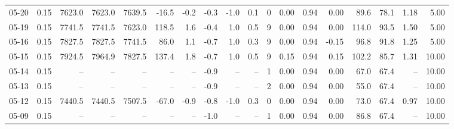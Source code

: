 \begin{threeparttable}
{\begin{tabular}{lrrrrrrrrrrrrrrrrr}
  05-20 &     0.15 & 7623.0 & 7623.0 & 7639.5 &      -16.5 &           -0.2 &                      -0.3 &                     -1.0 &                 0.1 &              0 &       0.00 &      0.94 &           0.00 &             89.6 &                78.1 &            1.18 &                   5.00 \\
  05-19 &     0.15 & 7741.5 & 7741.5 & 7623.0 &      118.5 &            1.6 &                      -0.4 &                      1.0 &                 0.5 &              9 &       0.00 &      0.94 &           0.00 &            114.0 &                93.5 &            1.50 &                   5.00 \\
  05-16 &     0.15 & 7827.5 & 7827.5 & 7741.5 &       86.0 &            1.1 &                      -0.7 &                      1.0 &                 0.3 &              9 &       0.00 &      0.94 &          -0.15 &             96.8 &                91.8 &            1.25 &                   5.00 \\
  05-15 &     0.15 & 7924.5 & 7964.9 & 7827.5 &      137.4 &            1.8 &                      -0.7 &                      1.0 &                 0.5 &              9 &       0.15 &      0.94 &           0.15 &            102.2 &                85.7 &            1.31 &                  10.00 \\
  05-14 &     0.15 &     -- &     -- &     -- &         -- &             -- &                      -0.9 &                       -- &                  -- &              1 &       0.00 &      0.94 &           0.00 &             67.0 &                67.4 &              -- &                  10.00 \\
  05-13 &     0.15 &     -- &     -- &     -- &         -- &             -- &                      -0.9 &                       -- &                  -- &              2 &       0.00 &      0.94 &           0.00 &             55.0 &                67.4 &              -- &                  10.00 \\
  05-12 &     0.15 & 7440.5 & 7440.5 & 7507.5 &      -67.0 &           -0.9 &                      -0.8 &                     -1.0 &                 0.3 &              0 &       0.00 &      0.94 &           0.00 &             73.0 &                67.4 &            0.97 &                  10.00 \\
  05-09 &     0.15 &     -- &     -- &     -- &         -- &             -- &                      -1.0 &                       -- &                  -- &              1 &       0.00 &      0.94 &           0.00 &             86.8 &                67.4 &              -- &                  10.00 \\

\end{tabular}}
\end{threeparttable}
